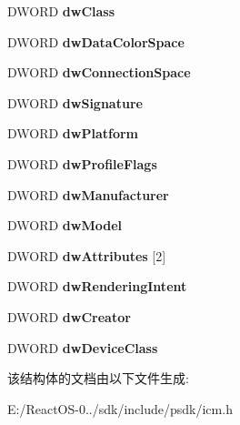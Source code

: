 \begin{DoxyCompactItemize}
D\+W\+O\+RD {\bfseries dw\+Class}
\item 
\mbox{\label{structtag_e_n_u_m_t_y_p_e_w_afefed37acde1f7df348225266eb5d7ab}} 
D\+W\+O\+RD {\bfseries dw\+Data\+Color\+Space}
\item 
\mbox{\label{structtag_e_n_u_m_t_y_p_e_w_a25fa691253b6949d8652ce8808fea348}} 
D\+W\+O\+RD {\bfseries dw\+Connection\+Space}
\item 
\mbox{\label{structtag_e_n_u_m_t_y_p_e_w_a91a7df2424572840d6b114b7a896d4fe}} 
D\+W\+O\+RD {\bfseries dw\+Signature}
\item 
\mbox{\label{structtag_e_n_u_m_t_y_p_e_w_a65a6ea848fb2d74d23c483794e349098}} 
D\+W\+O\+RD {\bfseries dw\+Platform}
\item 
\mbox{\label{structtag_e_n_u_m_t_y_p_e_w_a2a48a2a1feff3ca84c11171ee61c5afd}} 
D\+W\+O\+RD {\bfseries dw\+Profile\+Flags}
\item 
\mbox{\label{structtag_e_n_u_m_t_y_p_e_w_a0931f0c8f54bd9985b178244af008199}} 
D\+W\+O\+RD {\bfseries dw\+Manufacturer}
\item 
\mbox{\label{structtag_e_n_u_m_t_y_p_e_w_a28b152e5b58110e4c914e3254bfc9d30}} 
D\+W\+O\+RD {\bfseries dw\+Model}
\item 
\mbox{\label{structtag_e_n_u_m_t_y_p_e_w_a80d1eb51fd2d40458cc5d6d50d3370fe}} 
D\+W\+O\+RD {\bfseries dw\+Attributes} \mbox{[}2\mbox{]}
\item 
\mbox{\label{structtag_e_n_u_m_t_y_p_e_w_aebfac5795d693e54702b0b52f4e6f2b1}} 
D\+W\+O\+RD {\bfseries dw\+Rendering\+Intent}
\item 
\mbox{\label{structtag_e_n_u_m_t_y_p_e_w_a7e3045d1b823cfdb0f24d01acffff288}} 
D\+W\+O\+RD {\bfseries dw\+Creator}
\item 
\mbox{\label{structtag_e_n_u_m_t_y_p_e_w_a79ff9a007667348528db7c34210fd8fa}} 
D\+W\+O\+RD {\bfseries dw\+Device\+Class}
\end{DoxyCompactItemize}


该结构体的文档由以下文件生成\+:\begin{DoxyCompactItemize}
\item 
E\+:/\+React\+O\+S-\/0../sdk/include/psdk/icm.\+h\end{DoxyCompactItemize}
